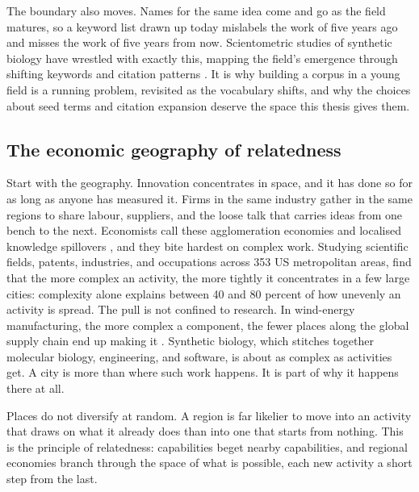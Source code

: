 \documentclass[12pt,a4paper]{article}
\begin{document}
	The boundary also moves. Names for the same idea come and go as the field matures,
	so a keyword list drawn up today mislabels the work of five years ago and misses
	the work of five years from now. Scientometric studies of synthetic biology have
	wrestled with exactly this, mapping the field's emergence through shifting keywords
	and citation patterns \citep{shapiraTrackingEmergenceSynthetic2017,
		raimbaultMappingEmergenceSynthetic2016}. It is why building a corpus in a young
	field is a running problem, revisited as the vocabulary shifts, and why the choices
	about seed terms and citation expansion deserve the space this thesis gives them.
	
	\subsection{The economic geography of relatedness}
	
	Start with the geography. Innovation concentrates in space, and it has done so for
	as long as anyone has measured it. Firms in the same industry gather in the same
	regions to share labour, suppliers, and the loose talk that carries ideas from one
	bench to the next. Economists call these agglomeration economies and localised
	knowledge spillovers \citep{breschiKnowledgeSpilloversLocal2001}, and they bite
	hardest on complex work. Studying scientific fields, patents, industries, and
	occupations across 353 US metropolitan areas,
	\citet{ballandComplexEconomicActivities2020} find that the more complex an activity,
	the more tightly it concentrates in a few large cities: complexity alone explains
	between 40 and 80 percent of how unevenly an activity is spread. The pull is not
	confined to research. In wind-energy manufacturing, the more complex a component,
	the fewer places along the global supply chain end up making it
	\citep{suranaEffectsTechnologyComplexity2020}. Synthetic biology,
	which stitches together molecular biology, engineering, and software, is about as
	complex as activities get. A city is more than where such work happens. It is part
	of why it happens there at all.
	
	Places do not diversify at random. A region is far likelier to move into an
	activity that draws on what it already does than into one that starts from nothing.
	This is the principle of relatedness: capabilities beget nearby capabilities, and
	regional economies branch through the space of what is possible, each new activity
	a short step from the last.
	
\end{document}
